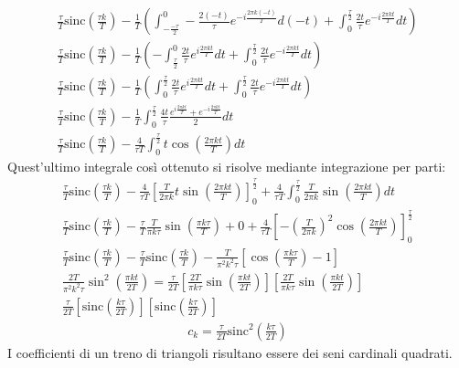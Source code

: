 \documentclass{article}
\begin{document}
\begin{gather*}
    \displaystyle\frac{\tau}{T}\mbox{sinc}\left(\frac{\tau k}{T}\right)-\frac{1}{T}\left(\int_{-\frac{-\tau}{2}}^{0}-\frac{2(-t)}{\tau}e^{-i\frac{2\pi k(-t)}{T}}d(-t)+\int_{0}^{\frac{\tau}{2}}\frac{2t}{\tau}e^{-i\frac{2\pi kt}{T}}dt\right)\\
    \displaystyle\frac{\tau}{T}\mbox{sinc}\left(\frac{\tau k}{T}\right)-\frac{1}{T}\left(-\int_{\frac{\tau}{2}}^{0}\frac{2t}{\tau}e^{i\frac{2\pi kt}{T}}dt+\int_{0}^{\frac{\tau}{2}}\frac{2t}{\tau}e^{-i\frac{2\pi kt}{T}}dt\right)\\
    \displaystyle\frac{\tau}{T}\mbox{sinc}\left(\frac{\tau k}{T}\right)-\frac{1}{T}\left(\int^{\frac{\tau}{2}}_{0}\frac{2t}{\tau}e^{i\frac{2\pi kt}{T}}dt+\int_{0}^{\frac{\tau}{2}}\frac{2t}{\tau}e^{-i\frac{2\pi kt}{T}}dt\right)\\
    \displaystyle\frac{\tau}{T}\mbox{sinc}\left(\frac{\tau k}{T}\right)-\frac{1}{T}\int^{\frac{\tau}{2}}_{0}\frac{4t}{\tau}\frac{e^{i\frac{2\pi kt}{T}}+e^{-i\frac{2\pi kt}{T}}}{2}dt\\
    \displaystyle\frac{\tau}{T}\mbox{sinc}\left(\frac{\tau k}{T}\right)-\frac{4}{\tau T}\int_{0}^{\frac{\tau}{2}}t\cos\left(\frac{2\pi kt}{T}\right)dt
\end{gather*}
Quest'ultimo integrale così ottenuto si risolve mediante integrazione per parti:
\begin{gather*}
    \displaystyle\frac{\tau}{T}\mbox{sinc}\left(\frac{\tau k}{T}\right)-\frac{4}{\tau T}\left[\frac{T}{2\pi k}t\sin\left(\frac{2\pi kt}{T}\right)\right]^{\frac{\tau}{2}}_0
    +\frac{4}{\tau T}\int_{0}^{\frac{\tau}{2}}\frac{T}{2\pi k}\sin\left(\frac{2\pi kt}{T}\right)dt\\
    \displaystyle\frac{\tau}{T}\mbox{sinc}\left(\frac{\tau k}{T}\right)-\frac{\tau}{T}\frac{T}{\pi k\tau}\sin\left(\frac{\pi k\tau}{T}\right)+0+
    \frac{4}{\tau T}\left[-\left(\frac{T}{2\pi k}\right)^2\cos\left(\frac{2\pi kt}{T}\right)\right]^{\frac{\tau}{2}}_0\\
    \displaystyle\frac{\tau}{T}\mbox{sinc}\left(\frac{\tau k}{T}\right)-\displaystyle\frac{\tau}{T}\mbox{sinc}\left(\frac{\tau k}{T}\right)-
    \frac{T}{\pi^2k^2\tau}\left[\cos\left(\frac{\pi k\tau}{T}\right)-1\right]\\
    \displaystyle\frac{2T}{\pi^2k^2\tau}\sin^2\left(\frac{\pi kt}{2T}\right)=
    \frac{\tau}{2T}\left[\frac{2T}{\pi k\tau}\sin\left(\frac{\pi kt}{2T}\right)\right]\left[\frac{2T}{\pi k\tau}\sin\left(\frac{\pi kt}{2T}\right)\right]\\
    \displaystyle\frac{\tau}{2T}\left[\mbox{sinc}\left(\frac{k\tau}{2T}\right)\right]\left[\mbox{sinc}\left(\frac{k\tau}{2T}\right)\right]
\end{gather*}
\begin{gather}
    c_k=\displaystyle\frac{\tau}{2T}\mbox{sinc}^2\left(\frac{k\tau }{2T}\right)
\end{gather}
I coefficienti di un treno di triangoli risultano essere dei seni cardinali quadrati. 
\end{document}
